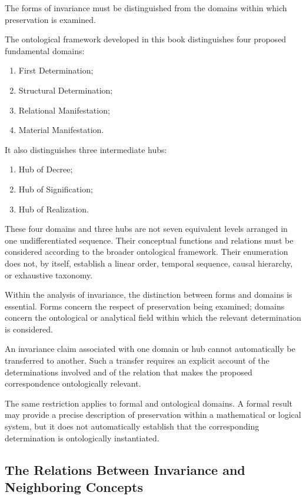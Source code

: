 The forms of invariance must be distinguished from
the domains within which preservation is examined.

The ontological framework developed in this book
distinguishes four proposed fundamental domains:

\begin{enumerate}
    \item First Determination;
    \item Structural Determination;
    \item Relational Manifestation;
    \item Material Manifestation.
\end{enumerate}

It also distinguishes three intermediate hubs:

\begin{enumerate}
    \item Hub of Decree;
    \item Hub of Signification;
    \item Hub of Realization.
\end{enumerate}

These four domains and three hubs are not seven
equivalent levels arranged in one undifferentiated
sequence. Their conceptual functions and relations
must be considered according to the broader
ontological framework. Their enumeration does
not, by itself, establish a linear order, temporal
sequence, causal hierarchy, or exhaustive taxonomy.

Within the analysis of invariance, the distinction
between forms and domains is essential. Forms concern
the respect of preservation being examined; domains
concern the ontological or analytical field within
which the relevant determination is considered.

An invariance claim associated with one domain
or hub cannot automatically be transferred to
another. Such a transfer requires an explicit
account of the determinations involved and of
the relation that makes the proposed correspondence
ontologically relevant.

The same restriction applies to formal and
ontological domains. A formal result may provide
a precise description of preservation within a
mathematical or logical system, but it does not
automatically establish that the corresponding
determination is ontologically instantiated.

\subsection{The Relations Between Invariance and Neighboring Concepts}

